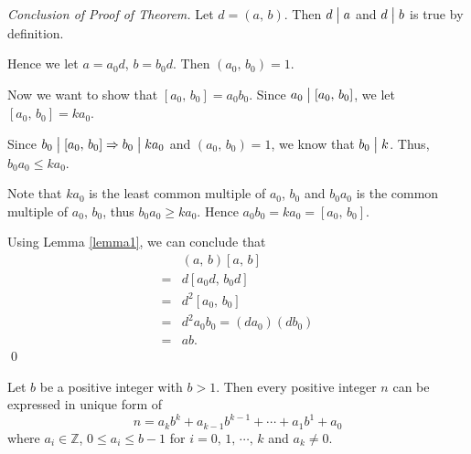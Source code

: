\begin{proof}[Conclusion of Proof of Theorem]
    Let $d=\left(a,\,b\right)$. Then $d \bigm| a$ and $d \bigm| b$ is true by definition.

    Hence we let $a=a_0d$, $b=b_0d$. Then $\left(a_0,\,b_0\right)=1$.

    Now we want to show that $\left[a_0,\,b_0\right]=a_0b_0$. Since $a_0 \bigm| \left[a_0,\,b_0\right]$,
    we let $\left[a_0,\,b_0\right]=ka_0$.

    Since $b_0 \bigm| \left[a_0,\,b_0\right] \Rightarrow b_0 \bigm| ka_0$ and $\left(a_0,\,b_0\right)=1$,
    we know that $b_0 \bigm| k$. Thus, $b_0a_0 \leq ka_0$.

    Note that $ka_0$ is the least common multiple of $a_0$, $b_0$ and
    $b_0a_0$ is the common multiple of $a_0$, $b_0$, thus $b_0a_0 \geq ka_0$.
    Hence $a_0b_0 = ka_0 = \left[a_0,\,b_0\right]$.

    Using Lemma \ref{lemma1}, we can conclude that
    \begin{align*}
        & \left(a,\,b\right)\left[a,\,b\right] \\  
        =& d \left[a_0d,\,b_0d\right] \\
        =& d^2 \left[a_0,\,b_0\right] \\
        =& d^2a_0b_0 = \left(da_0\right)\left(db_0\right) \\
        =& ab.
    \end{align*}
    \qed
\end{proof}

\begin{theorem}
    Let $b$ be a positive integer with $b>1$. Then every positive integer
    $n$ can be expressed in unique form of
    \[
        n=a_kb^k + a_{k-1}b^{k-1} + \cdots + a_1b^1 + a_0
    \]  
    where $a_i \in \mathbb{Z}$, $0 \leq a_i \leq b-1$ for $i=0,\,1,\,\cdots,\,k$
    and $a_k \neq 0$.
\end{theorem}

